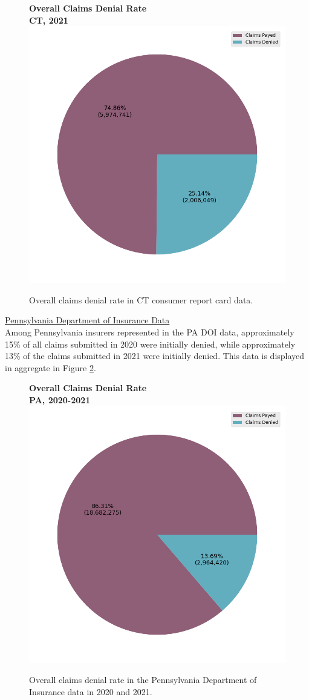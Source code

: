 \documentclass[12pt, a4paper,twoside,parskip=full]{report}
\theoremstyle{plain} %
\theoremstyle{definition} %
\theoremstyle{remark} %
\numberwithin{equation}{chapter}
\begin{document}
		\begin{figure}[h!]
			\centering
			\textbf{Overall Claims Denial Rate}\\
			\textbf{CT, 2021}\\
			\includegraphics[width=.6\columnwidth]{images/ct_claims/overall_denial_pie.png}
			\caption{Overall claims denial rate in CT consumer report card data.}
			\label{ctoveralldenial}
		\end{figure}
	
	\clearpage
		
		\underline{Pennsylvania Department of Insurance Data}\\
		
		Among Pennsylvania insurers represented in the PA DOI data, approximately 15\% of all claims submitted in 2020 were initially denied, while approximately 13\% of the claims submitted in 2021 were initially denied. This data is displayed in aggregate in Figure \ref{paoveralldenial}.
		
		\begin{figure}[h!]
			\centering
			\textbf{Overall Claims Denial Rate}\\
			\textbf{PA, 2020-2021}\\
			\includegraphics[width=.6\columnwidth]{images/pa_claims/overall_denial_pie.png}
			\caption{Overall claims denial rate in the Pennsylvania Department of Insurance data in 2020 and 2021.}
			\label{paoveralldenial}
		\end{figure}
	\clearpage
		
\end{document}
